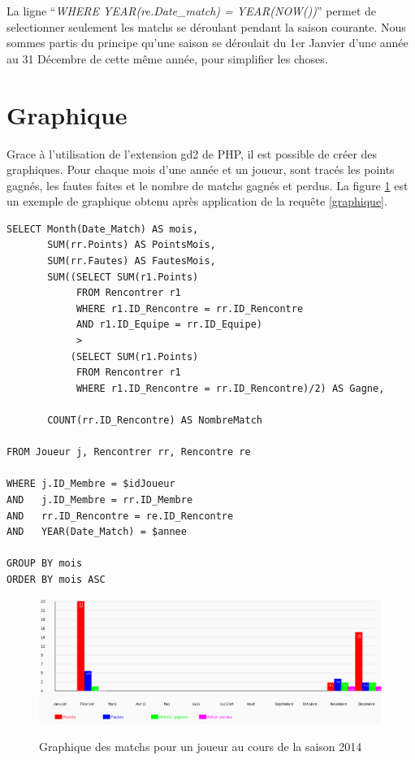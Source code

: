 \documentclass[a4paper,8pt,french,fleqn]{report}
\begin{document}
La ligne ``\textit{WHERE YEAR(re.Date\_match) = YEAR(NOW())}'' permet de selectionner seulement les matchs se déroulant pendant la saison courante. Nous sommes partis du principe qu'une saison se déroulait du 1er Janvier d'une année au 31 Décembre de cette même année, pour simplifier les choses.


\section{Graphique}
Grace à l'utilisation de l'extension gd2 de PHP, il est possible de créer des graphiques. Pour chaque mois d'une année et un joueur, sont tracés les points gagnés, les fautes faites et le nombre de matchs gagnés et perdus. La figure \ref{fig:graph} est un exemple de graphique obtenu après application de la requête \ref{graphique}.

\begin{lstlisting}
SELECT Month(Date_Match) AS mois,
       SUM(rr.Points) AS PointsMois,
       SUM(rr.Fautes) AS FautesMois,
       SUM((SELECT SUM(r1.Points)
            FROM Rencontrer r1
            WHERE r1.ID_Rencontre = rr.ID_Rencontre
            AND r1.ID_Equipe = rr.ID_Equipe)
            >
           (SELECT SUM(r1.Points)
            FROM Rencontrer r1
            WHERE r1.ID_Rencontre = rr.ID_Rencontre)/2) AS Gagne,
    
       COUNT(rr.ID_Rencontre) AS NombreMatch

FROM Joueur j, Rencontrer rr, Rencontre re

WHERE j.ID_Membre = $idJoueur
AND   j.ID_Membre = rr.ID_Membre
AND   rr.ID_Rencontre = re.ID_Rencontre
AND   YEAR(Date_Match) = $annee

GROUP BY mois 
ORDER BY mois ASC
\end{lstlisting}

\begin{figure}[h]
  \centering
    \includegraphics[scale=0.5]{graphe.png}
    \label{fig:graph}
    \caption{Graphique des matchs pour un joueur au cours de la saison 2014}
\end{figure}
\end{document}
